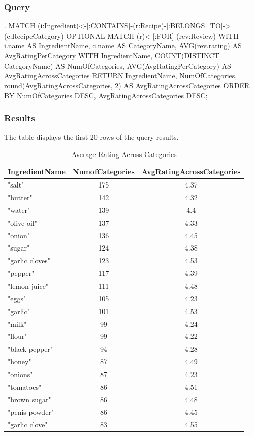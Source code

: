 \begin{enumerate}
    \subsubsection{Query}
\begin{CypherQuery}
.
MATCH 
(i:Ingredient)<-[:CONTAINS]-(r:Recipe)-[:BELONGS_TO]->(c:RecipeCategory)
OPTIONAL MATCH  (r)<-[:FOR]-(rev:Review)
WITH i.name AS IngredientName, c.name AS CategoryName, 
AVG(rev.rating) AS AvgRatingPerCategory
WITH IngredientName, 
COUNT(DISTINCT CategoryName) AS NumOfCategories, 
AVG(AvgRatingPerCategory) AS AvgRatingAcrossCategories
RETURN IngredientName, NumOfCategories, 
round(AvgRatingAcrossCategories, 2) AS AvgRatingAcrossCategories
ORDER BY NumOfCategories DESC, 
AvgRatingAcrossCategories DESC;
\end{CypherQuery}
    \subsubsection{Results}
    The table displays the first 20 rows of the query results.
    \begin{table}[h!]
\small %
\centering
\begin{tabularx}{\textwidth}{>{\raggedright\arraybackslash}Xcc}
\toprule
\textbf{IngredientName} & \textbf{NumofCategories} & \textbf{AvgRatingAcrossCategories} \\
\midrule
"salt" & 175 & 4.37 \\
"butter" & 142 & 4.32 \\
"water" & 139 & 4.4 \\
"olive oil" & 137 & 4.33 \\
"onion" & 136 & 4.45 \\
"sugar" & 124 & 4.38 \\
"garlic cloves" & 123 & 4.53 \\
"pepper" & 117 & 4.39 \\
"lemon juice" & 111 & 4.48 \\
"eggs" & 105 & 4.23 \\
"garlic" & 101 & 4.53 \\
"milk" & 99 & 4.24 \\
"flour" & 99 & 4.22 \\
"black pepper" & 94 & 4.28 \\
"honey" & 87 & 4.49 \\
"onions" & 87 & 4.23 \\
"tomatoes" & 86 & 4.51 \\
"brown sugar" & 86 & 4.48 \\
"penis powder" & 86 & 4.45 \\
"garlic clove" & 83 & 4.55 \\
\bottomrule
\end{tabularx}
\caption{Average Rating Across Categories}
\label{tab:ingredient_ratings}
\end{table}

\end{enumerate}
